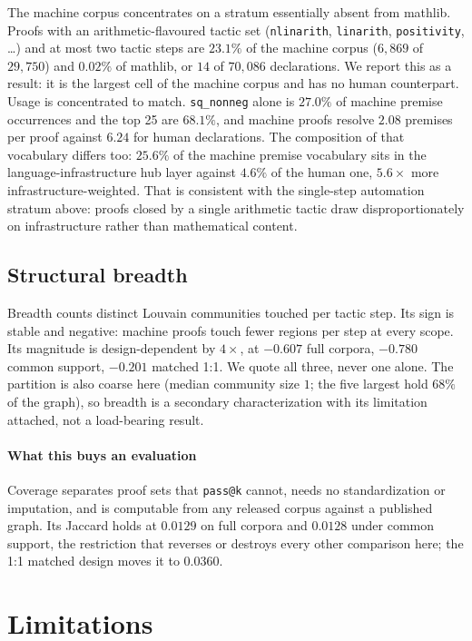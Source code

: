 \documentclass{article}
\begin{document}
The machine corpus concentrates on a stratum essentially absent from mathlib.
Proofs with an arithmetic-flavoured tactic set (\texttt{nlinarith},
\texttt{linarith}, \texttt{positivity}, \dots) and at most two tactic steps are
$23.1\%$ of the machine corpus ($6{,}869$ of $29{,}750$) and $0.02\%$ of mathlib,
or $14$ of $70{,}086$ declarations. We report this as a result: it is the largest
cell of the machine corpus and has no human counterpart. Usage is concentrated to
match. \texttt{sq\_nonneg} alone is $27.0\%$ of machine premise occurrences and
the top 25 are $68.1\%$, and machine proofs resolve $2.08$ premises per proof
against $6.24$ for human declarations. The composition of that vocabulary differs too: $25.6\%$ of the
machine premise vocabulary sits in the language-infrastructure hub layer against
$4.6\%$ of the human one, $5.6\times$ more infrastructure-weighted. That is
consistent with the single-step automation stratum above: proofs closed by a
single arithmetic tactic draw disproportionately on infrastructure rather than
mathematical content.

\subsection{Structural breadth}

Breadth counts distinct Louvain communities touched per tactic step. Its sign is
stable and negative: machine proofs touch fewer regions per step at every scope.
Its magnitude is design-dependent by $4\times$, at $-0.607$ full corpora,
$-0.780$ common support, $-0.201$ matched 1:1. We quote all three, never
one alone. The partition is also coarse here (median community size $1$; the five
largest hold $68\%$ of the graph), so breadth is a secondary characterization
with its limitation attached, not a load-bearing result.

\paragraph{What this buys an evaluation}
Coverage separates proof sets that \texttt{pass@k} cannot, needs no
standardization or imputation, and is computable from any released corpus
against a published graph. Its Jaccard holds at $0.0129$ on full corpora and
$0.0128$ under common support, the restriction that reverses or destroys every
other comparison here; the 1:1 matched design moves it to $0.0360$.

\section{Limitations}\label{lim0}
\label{sec:lim}
\end{document}
